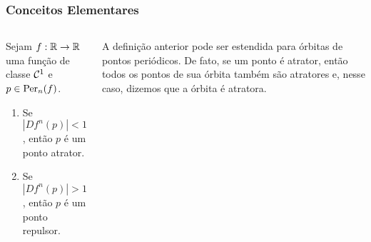
\begin{frame}
\vspace{5pt}
\frametitle{Conceitos Elementares}
\begin{columns}
\column{\dimexpr\paperwidth-15pt}

\begin{definition}
Sejam $f: \mathbb{R} \to \mathbb{R}$ uma função de classe $\mathcal{C}^1$ e $p \in \operatorname{Per}_n(f)$.
\begin{enumerate}
\item Se $|D f^n(p)| < 1$, então $p$ é um ponto atrator.
\item Se $|D f^n(p)| > 1$, então $p$ é um ponto repulsor.
\end{enumerate}
\end{definition}
\pause
A definição anterior pode ser estendida para órbitas de pontos periódicos. De fato, se um ponto é atrator, então todos os pontos de sua órbita também são atratores e, nesse caso, dizemos que a órbita é atratora.

\end{columns}
\end{frame}

